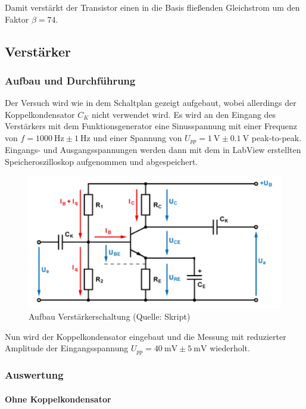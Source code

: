 \documentclass[12pt,twoside,a4paper]{scrartcl}
\begin{document}
				Damit verstärkt der Transistor einen in die Basis fließenden Gleichstrom um den Faktor $ \beta = 74$.

    \subsection{Verstärker}

			\subsubsection{Aufbau und Durchführung}

			Der Versuch wird wie in dem Schaltplan gezeigt aufgebaut, wobei allerdings der Koppelkondensator $C_K$ nicht verwendet wird.
			Es wird an den Eingang des Verstärkers mit dem Funktionsgenerator eine Sinusspannung mit einer Frequenz von $f = \SI{1000}{\hertz} \pm \SI{1}{\hertz}$
		  und einer Spannung von $U_{pp} = \SI{1}{\volt} \pm \SI{0.1}{\volt}$ peak-to-peak.
			Eingangs- und Ausgangsspannungen werden dann mit dem in LabView erstellten Speicheroszilloskop aufgenommen und abgespeichert.

			\begin{figure}[H]
				\centering
				\includegraphics[width = 0.8 \textwidth]{Pictures/amp}
				\caption{Aufbau Verstärkerschaltung (Quelle: Skript)}
			\end{figure}

			Nun wird der Koppelkondensator eingebaut und die Messung mit reduzierter Amplitude der Eingangsspannung $U_{pp} = \SI{40}{\milli \volt} \pm \SI{5}{\milli \volt}$ wiederholt.

			\subsubsection{Auswertung}

			\paragraph{Ohne Koppelkondensator}
\end{document}
